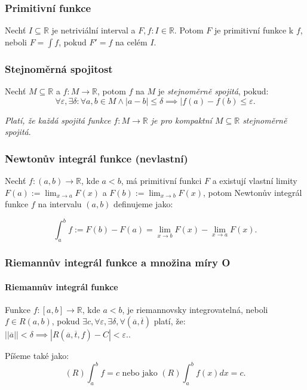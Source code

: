 \documentclass[10pt,a4paper]{article}
\newcommand{\R}{{\mathbb{R}}}
\begin{document}
\subsubsection{Primitivní funkce} 
Nechť $I\subseteq \R$ je netriviální interval a $F, f: I\in \R$. Potom $F$ je primitivní funkce k $f$, neboli $\displaystyle F = \int f$, pokud $F'=f$ na celém $I$. 

\subsubsection{Stejnoměrná spojitost} 

Nechť $M\subseteq \R$ a $f:M\to \R$, potom $f$ na $M$ je \textit{stejnoměrně spojitá}, pokud:
\[
    \forall \varepsilon, \exists \delta : \forall a, b \in M \land |a-b| \leq \delta \implies |f(a) - f(b) \leq \varepsilon.
\] 

\textit{Platí, že každá spojitá funkce $f:M\to \R$ je pro kompaktní $M\subseteq \R$ stejnoměrně spojitá}.

\subsubsection{Newtonův integrál funkce (nevlastní)}

Nechť $f:(a,b)\to \R$, kde $a<b$, má primitivní funkci $F$ a existují vlastní limity $\displaystyle F(a):= \lim_{x\to a}F(x)$ a $F(b):= \displaystyle \lim_{x\to b}F(x)$, 
potom Newtonův integrál funkce $f$ na intervalu $(a, b)$ definujeme jako:

\[
    \int_{a}^{b}f:= F(b) - F(a) = \lim_{x\to b}F(x) - \lim_{x\to a} F(x).
\] 

\subsubsection{Riemannův integrál funkce a množina míry O}
\paragraph*{Riemannův integrál funkce} Funkce $f: [a, b] \to \R$, kde $a< b$, je riemannovsky integrovatelná, neboli \\
$f\in R(a,b)$, pokud $\exists c, \forall \varepsilon, \exists \delta, \forall (\overline{a}, \overline{t})$ platí, že:
\(
    ||\overline{a}|| < \delta \implies |R(\overline{a}, \overline{t}, f) - C | < \varepsilon.
\).

Píšeme také jako:
\[
    (R) \int_{a}^{b} f = c \text{ nebo jako } (R) \int_{a}^{b} f(x) dx = c.
\]
\end{document}
